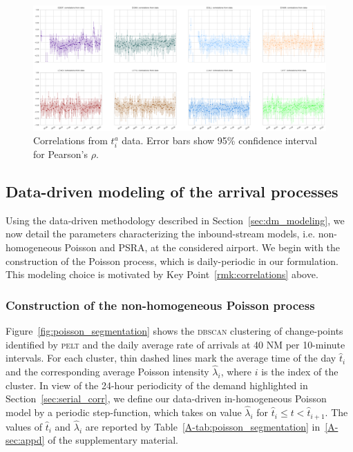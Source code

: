 \documentclass[draft,review]{elsarticle}
\makeatletter
\newcommand*{\ie}{i.e.\@\xspace}
\newcommand{\PELT}{\textsc{pelt}}
\newcommand{\DBSCAN}{\textsc{dbscan}}
\makeatother
\begin{document}
\begin{figure}
    \includegraphics[width=\textwidth]{correlations_true}
    \caption{Correlations from \(t^{a}_i\) data. Error bars show 95\% confidence interval for Pearson's \(\rho\).}
    \label{fig:correlations_true}
\end{figure}

\subsection{Data-driven modeling of the arrival processes}\label{sec:modeling}

Using the data-driven methodology described in Section~\ref{sec:dm_modeling}, we now detail the parameters characterizing the inbound-stream models, \ie{} non-homogeneous Poisson and \ac{PSRA}, at the considered airport.
We begin with the construction of the Poisson process, which is daily-periodic in our formulation.
This modeling choice is motivated by Key Point~\ref{rmk:correlations} above.

\subsubsection{Construction of the non-homogeneous Poisson process}\label{sec:pois}

Figure~\ref{fig:poisson_segmentation} shows the \DBSCAN{} clustering of change-points identified by \PELT{} and the daily average rate of arrivals at 40 NM per 10-minute  intervals.
For each cluster, thin dashed lines mark the average time of the day \(\hat{t}_i\) and the corresponding average Poisson intensity \(\hat{\lambda}_i\), where \(i\) is the index of the cluster.
In view of the 24-hour periodicity of the demand highlighted in Section~\ref{sec:serial_corr}, we define our data-driven in-homogeneous Poisson model by a periodic step-function, which takes on value \(\hat{\lambda}_i\) for \(\hat{t}_i \leq t < \hat{t}_{i+1}\).
The values of \(\hat{t}_i\) and \(\hat{\lambda}_i\) are reported by Table~\ref{A-tab:poisson_segmentation} in~\ref{A-sec:appd} of the supplementary material.
\end{document}
